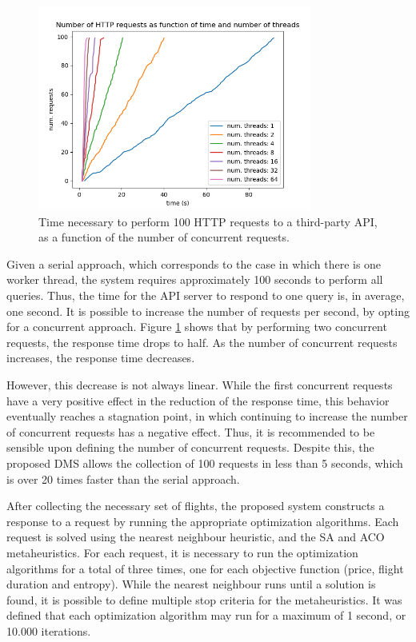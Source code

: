 \begin{figure}[h]
  \centering
  \includegraphics[width=9cm]{./Figures/results/dms_factory.png}
  \caption{Time necessary to perform 100 HTTP requests to a third-party API, as a function of the number of concurrent requests.}
  \label{fig:dms_factory}  
\end{figure}

Given a serial approach, which corresponds to the case in which there is one worker thread, the system requires approximately 100 seconds to perform all queries. Thus, the time for the API server to respond to one query is, in average, one second. It is possible to increase the number of requests per second, by opting for a concurrent approach. Figure \ref{fig:dms_factory} shows that by performing two concurrent requests, the response time drops to half. As the number of concurrent requests increases, the response time decreases. 

However, this decrease is not always linear. While the first concurrent requests have a very positive effect in the reduction of the response time, this behavior eventually reaches a stagnation point, in which continuing to increase the number of concurrent requests has a negative effect. Thus, it is recommended to be sensible upon defining the number of concurrent requests. Despite this, the proposed DMS allows the collection of 100 requests in less than 5 seconds, which is over 20 times faster than the serial approach.

After collecting the necessary set of flights, the proposed system constructs a response to a request by running the appropriate optimization algorithms. Each request is solved using the nearest neighbour heuristic, and the SA and ACO metaheuristics. For each request, it is necessary to run the optimization algorithms for a total of three times, one for each objective function (price, flight duration and entropy). While the nearest neighbour runs until a solution is found, it is possible to define multiple stop criteria for the metaheuristics. It was defined that each optimization algorithm may run for a maximum of 1 second, or 10.000 iterations.

